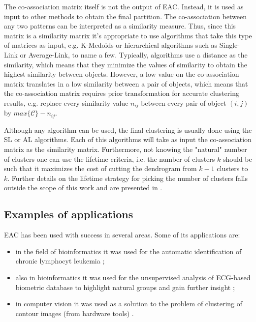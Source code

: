 The co-association matrix itself is not the output of EAC.
Instead, it is used as input to other methods to obtain the final partition.
The co-association between any two patterns can be interpreted as a similarity measure.
Thus, since this matrix is a similarity matrix it's appropriate to use algorithms that take this type of matrices as input, e.g. K-Medoids or hierarchical algorithms such as Single-Link or Average-Link, to name a few.
Typically, algorithms use a distance as the similarity, which means that they minimize the values of similarity to obtain the highest similarity between objects.
However, a low value on the co-association matrix translates in a low similarity between a pair of objects, which means that the co-association matrix requires prior transformation for accurate clustering results, e.g. replace every similarity value $n_{ij}$ between every pair of object $(i,j)$ by $max \{ \mathcal{C} \} - n_{ij}$.

Although any algorithm can be used, the final clustering is usually done using the SL or AL algorithms.
Each of this algorithms will take as input the co-association matrix as the similarity matrix.
Furthermore, not knowing the "natural" number of clusters one can use the lifetime criteria, i.e. the number of clusters $k$ should be such that it maximizes the cost of cutting the dendrogram from $k-1$ clusters to $k$.
Further details on the lifetime strategy for picking the number of clusters falls outside the scope of this work and are presented in \cite{Fred2005}.

\subsection{Examples of applications}

EAC has been used with success in several areas. Some of its applications are:
\begin{itemize}
	\item in the field of bioinformatics it was used for the automatic identification of chronic lymphocyt leukemia \cite{Qian2010};
	\item also in bioinformatics it was used for the unsupervised analysis of ECG-based biometric database to highlight natural groups and gain further insight \cite{LourencoECG2009};
	\item in computer vision it was used as a solution to the problem of clustering of contour images (from hardware tools) \cite{Lourenco2007}.
\end{itemize}

